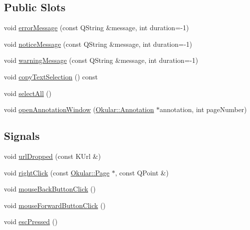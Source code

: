 \subsection*{Public Slots}
\begin{DoxyCompactItemize}
\item 
void \hyperlink{classPageView_abb4e669b96f8e6ec68b31c33706cbd57}{error\+Message} (const Q\+String \&message, int duration=-\/1)
\item 
void \hyperlink{classPageView_a48d63f3a6165d255d0a9b3db15e1e4c1}{notice\+Message} (const Q\+String \&message, int duration=-\/1)
\item 
void \hyperlink{classPageView_ae42b8ce77b65e819119d678b8e8a3aac}{warning\+Message} (const Q\+String \&message, int duration=-\/1)
\item 
void \hyperlink{classPageView_abee3291f817500a510a818cf5e2819d4}{copy\+Text\+Selection} () const 
\item 
void \hyperlink{classPageView_a36b404916903bf976e4eace4cf2d0410}{select\+All} ()
\item 
void \hyperlink{classPageView_aae69bcd4740466f5af216c97f1c12f14}{open\+Annotation\+Window} (\hyperlink{classOkular_1_1Annotation}{Okular\+::\+Annotation} $\ast$annotation, int page\+Number)
\end{DoxyCompactItemize}
\subsection*{Signals}
\begin{DoxyCompactItemize}
\item 
void \hyperlink{classPageView_a017a53158a7094db93d11a009bc56891}{url\+Dropped} (const K\+Url \&)
\item 
void \hyperlink{classPageView_a51ac8814a8f47fd02ac0b61627ad164f}{right\+Click} (const \hyperlink{classOkular_1_1Page}{Okular\+::\+Page} $\ast$, const Q\+Point \&)
\item 
void \hyperlink{classPageView_a8b0a87f4acb179634452cbe114572a47}{mouse\+Back\+Button\+Click} ()
\item 
void \hyperlink{classPageView_af268becfa1f02cb231f5779ea154918d}{mouse\+Forward\+Button\+Click} ()
\item 
void \hyperlink{classPageView_abdd34f6d1c775b32ccc3e8bc9d0e3c29}{esc\+Pressed} ()
\end{DoxyCompactItemize}
